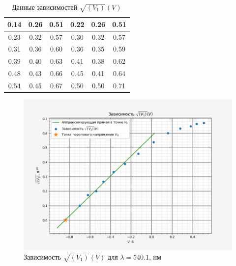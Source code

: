 \begin{enumerate}
\begin{table}[H]
\begin{tabular}{|ccc|ccc|}
                \multicolumn{1}{|c|}{0.14}   & \multicolumn{1}{c|}{0.26}     & 0.51                             & \multicolumn{1}{c|}{0.22}   & \multicolumn{1}{c|}{0.26}     & 0.51                             \\ \hline
                \multicolumn{1}{|c|}{0.23}   & \multicolumn{1}{c|}{0.32}     & 0.57                             & \multicolumn{1}{c|}{0.30}   & \multicolumn{1}{c|}{0.32}     & 0.57                             \\ \hline
                \multicolumn{1}{|c|}{0.31}   & \multicolumn{1}{c|}{0.36}     & 0.60                             & \multicolumn{1}{c|}{0.36}   & \multicolumn{1}{c|}{0.35}     & 0.59                             \\ \hline
                \multicolumn{1}{|c|}{0.39}   & \multicolumn{1}{c|}{0.40}     & 0.63                             & \multicolumn{1}{c|}{0.41}   & \multicolumn{1}{c|}{0.38}     & 0.62                             \\ \hline
                \multicolumn{1}{|c|}{0.48}   & \multicolumn{1}{c|}{0.43}     & 0.66                             & \multicolumn{1}{c|}{0.45}   & \multicolumn{1}{c|}{0.41}     & 0.64                             \\ \hline
                \multicolumn{1}{|c|}{0.54}   & \multicolumn{1}{c|}{0.45}     & 0.67                             & \multicolumn{1}{c|}{0.50}   & \multicolumn{1}{c|}{0.50}     & 0.71                             \\ \hline
            \end{tabular}
            \caption{Данные зависимостей $\sqrt{(V_1)}(V)$}
        \end{table}

        \begin{figure}[H]
            \centering
            \includegraphics[width = 12 cm]{images/plot_1}
            \caption{Зависимость $\sqrt{(V_1)}(V)$ для $\lambda = 540.1$, нм}
            \label{V_V1_1}
        \end{figure}


\end{enumerate}
